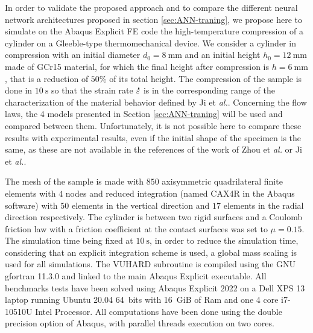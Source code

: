 \documentclass[algorithms,article,submit,pdftex,moreauthors]{Definitions/mdpi}
\makeatletter
\DeclareRobustCommand{\mdot}[1]{\accentset{\mbox{\bfseries .}}{#1}}
\DeclareRobustCommand{\eal}{et \emph{al.}\@\xspace}
\makeatother
\begin{document}
In order to validate the proposed approach and to compare the different neural network architectures proposed in section \ref{sec:ANN-traning}, we propose here to simulate on the Abaqus Explicit FE code the high-temperature compression of a cylinder on a Gleeble-type thermomechanical device.
We consider a cylinder in compression with an initial diameter $d_0=8~\text{mm}$ and an initial height $h_0=12~\text{mm}$ made of GCr15 material, for which the final height after compression is $h=6~\text{mm}$, that is a reduction of $50\%$ of its total height.
The compression of the sample is done in $10~\text{s}$ so that the strain rate  $\mdot\varepsilon$ is in the corresponding range of the characterization of the material behavior defined by Ji \eal \cite{Ji-2018}.
Concerning the flow laws, the 4 models presented in Section \ref{sec:ANN-traning} will be used and compared between them.
Unfortunately, it is not possible here to compare these results with experimental results, even if the initial shape of the specimen is the same, as these are not available in the references of the work of Zhou \eal \cite{Zhou-2020} or Ji \eal \cite{Ji-2018}.

The mesh of the sample is made with $850$ axisymmetric quadrilateral finite elements with $4$ nodes and reduced integration (named CAX4R in the Abaqus software) with $50$ elements in the vertical direction and $17$ elements in the radial direction respectively.
The cylinder is between two rigid surfaces and a Coulomb friction law with a friction coefficient at the contact surfaces was set to $\mu=0.15$.
The simulation time being fixed at $10~\text{s}$, in order to reduce the simulation time, considering that an explicit integration scheme is used, a global mass scaling is used for all simulations.
The VUHARD subroutine is compiled using the GNU gfortran 11.3.0 and linked to the main Abaqus Explicit executable.
All benchmarks tests have been solved using Abaqus Explicit 2022 on a Dell XPS 13 laptop running Ubuntu 20.04 64~bits with
16~GiB of Ram and one 4 core i7-10510U Intel Processor.
All computations have been done using the double precision option of Abaqus, with parallel threads execution on two cores.
\end{document}
